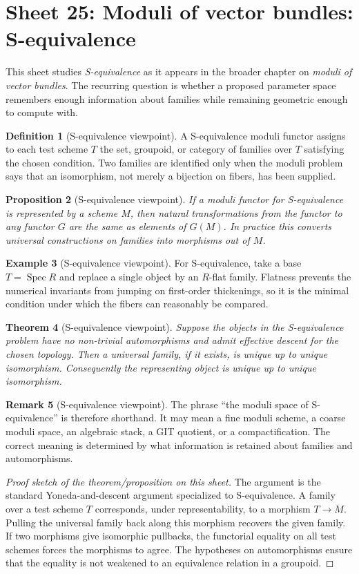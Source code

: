 \documentclass[11pt]{amsart}
\newtheorem{theorem}{Theorem}[section]
\newtheorem{proposition}[theorem]{Proposition}
\theoremstyle{definition}
\newtheorem{definition}[theorem]{Definition}
\newtheorem{example}[theorem]{Example}
\newtheorem{remark}[theorem]{Remark}
\newcommand{\Spec}{\operatorname{Spec}}
\begin{document}
\section{Sheet 25: Moduli of vector bundles: S-equivalence}
This sheet studies \emph{S-equivalence} as it appears in the broader chapter on \emph{moduli of vector bundles}.  The recurring question is whether a proposed parameter space remembers enough information about families while remaining geometric enough to compute with.
\begin{definition}[S-equivalence viewpoint]
A S-equivalence moduli functor assigns to each test scheme $T$ the set, groupoid, or category of families over $T$ satisfying the chosen condition.  Two families are identified only when the moduli problem says that an isomorphism, not merely a bijection on fibers, has been supplied.
\end{definition}
\begin{proposition}[S-equivalence viewpoint]
If a moduli functor for S-equivalence is represented by a scheme $M$, then natural transformations from the functor to any functor $G$ are the same as elements of $G(M)$.  In practice this converts universal constructions on families into morphisms out of $M$.
\end{proposition}
\begin{example}[S-equivalence viewpoint]
For S-equivalence, take a base $T=\Spec R$ and replace a single object by an $R$-flat family.  Flatness prevents the numerical invariants from jumping on first-order thickenings, so it is the minimal condition under which the fibers can reasonably be compared.
\end{example}
\begin{theorem}[S-equivalence viewpoint]
Suppose the objects in the S-equivalence problem have no non-trivial automorphisms and admit effective descent for the chosen topology.  Then a universal family, if it exists, is unique up to unique isomorphism.  Consequently the representing object is unique up to unique isomorphism.
\end{theorem}
\begin{remark}[S-equivalence viewpoint]
The phrase ``the moduli space of S-equivalence'' is therefore shorthand.  It may mean a fine moduli scheme, a coarse moduli space, an algebraic stack, a GIT quotient, or a compactification.  The correct meaning is determined by what information is retained about families and automorphisms.
\end{remark}
\begin{proof}[Proof sketch of the theorem/proposition on this sheet]
The argument is the standard Yoneda-and-descent argument specialized to S-equivalence.  A family over a test scheme $T$ corresponds, under representability, to a morphism $T\to M$.  Pulling the universal family back along this morphism recovers the given family.  If two morphisms give isomorphic pullbacks, the functorial equality on all test schemes forces the morphisms to agree.  The hypotheses on automorphisms ensure that the equality is not weakened to an equivalence relation in a groupoid.
\end{proof}
\end{document}
